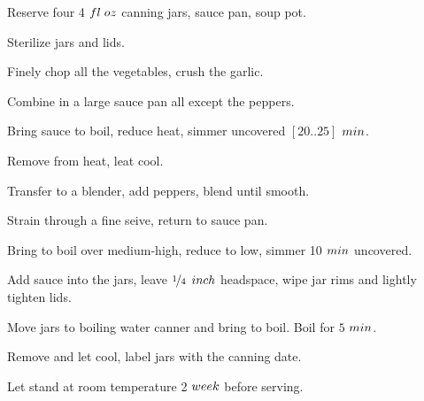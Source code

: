 \begin{preparation}
\item Reserve four 4 $\fluidounce$ canning jars, sauce pan, soup pot.
\item Sterilize jars and lids.
\item Finely chop all the vegetables, crush the garlic.
\item Combine in a large sauce pan all except the peppers.
\item Bring sauce to boil, reduce heat, simmer uncovered $[20 .. 25]$ $\minute$.
\item Remove from heat, leat cool.
\item Transfer to a blender, add peppers, blend until smooth.
\item Strain through a fine seive, return to sauce pan.
\item Bring to boil over medium-high, reduce to low, simmer 10 $\minute$ uncovered.
\item Add sauce into the jars, leave $\onefourth$ $\inch$ headspace, wipe jar rims and lightly tighten lids.
\item Move jars to boiling water canner and bring to boil.
	Boil for $5$ $\minute$.
\item Remove and let cool, label jars with the canning date.
\item Let stand at room temperature 2 $\week$ before serving.
\end{preparation}


\recipeend%
